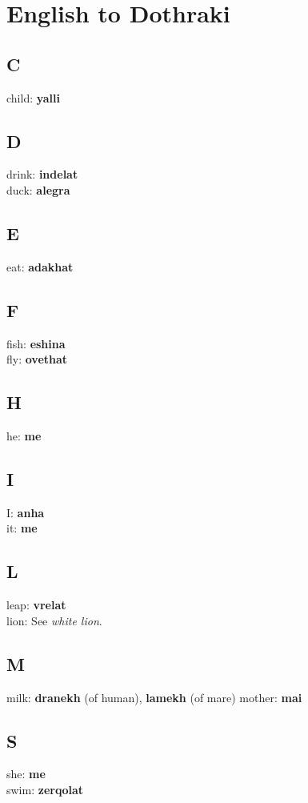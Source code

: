 \section*{English to Dothraki}
\begin{multicols}{2}
\subsection*{C}
child: \textbf{yalli} \\
\subsection*{D}
drink: \textbf{indelat} \\
duck: \textbf{alegra} \\
\subsection*{E}
eat: \textbf{adakhat} \\
\subsection*{F}
fish: \textbf{eshina} \\
fly: \textbf{ovethat} \\
\subsection*{H}
he: \textbf{me} \\
\subsection*{I}
I: \textbf{anha} \\
it: \textbf{me} \\
\subsection*{L}
leap: \textbf{vrelat} \\
lion: See \textit{white lion}.
\subsection*{M}
milk: \textbf{dranekh} (of human), \textbf{lamekh} (of mare)
mother: \textbf{mai}
\subsection*{S}
she: \textbf{me} \\
swim: \textbf{zerqolat} \\

\end{multicols}
